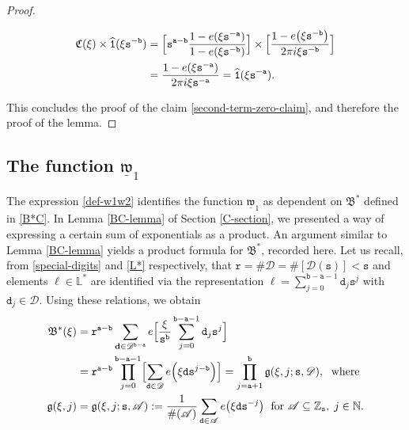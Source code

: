 \documentclass[12pt, twoside]{article}
\theoremstyle{definition}
\numberwithin{equation}{section}
\begin{document}
\begin{proof}
\begin{itemize}
\begin{align*} 
\mathfrak C(\xi) \times \widehat{\mathtt 1}(\xi \mathtt s^{-\mathtt b}) &= \Bigl[\mathtt s^{\mathtt a - \mathtt b} \frac{1 - e(\xi \mathtt s^{-\mathtt a})}{1 - e(\xi \mathtt s^{- \mathtt b})} \Bigr] \times \Bigl[\frac{1 - e \bigl(\xi \mathtt s^{-\mathtt b}\bigr)}{2 \pi i \xi \mathtt s^{-\mathtt b}} \Bigr] \\
&= \frac{1 - e(\xi \mathtt s^{-\mathtt a})}{2 \pi i \xi \mathtt s^{-\mathtt a}} = \widehat{\mathtt 1}(\xi \mathtt s^{-\mathtt a}).
\end{align*}
\end{itemize}
This concludes the proof of the claim \eqref{second-term-zero-claim}, and therefore the proof of the lemma.  
\end{proof}
\subsection{The function $\underline{\mathfrak w}_1$} \label{w1-section}
The expression \eqref{def-w1w2} identifies the function $\underline{\mathfrak w}_1$ as dependent on $\mathfrak B^{\ast}$ defined in \eqref{B*C}. In Lemma \ref{BC-lemma} of Section \ref{C-section}, we presented a way of expressing a certain sum of exponentials as a product. An argument similar to Lemma \ref{BC-lemma} yields a product formula for $\mathfrak B^{\ast}$, recorded here. Let us recall, from \eqref{special-digits} and \eqref{L*} respectively, that $\mathtt r = \# \mathscr{D} = \# [\mathscr{D}(\mathtt s)]< \mathtt s$ and elements $\ell \in \mathbb{L}^\ast$ are identified via the representation $\ell = \sum_{j = 0}^{\mathtt b-\mathtt a - 1} \mathtt d_j \mathtt s^j$ with $\mathtt d_j \in \mathscr{D}$. Using these relations, we obtain 
\begin{align} 
\mathfrak B^{\ast}(\xi) &= \mathtt r^{\mathtt a - \mathtt b} \sum_{\mathbf d \in \mathscr{D}^{\mathtt b -\mathtt a}} e \Bigl[ \frac{\xi}{\mathtt s^{\mathtt b}} \sum_{j=0}^{\mathtt b- \mathtt a -1} \mathtt d_j \mathtt s^j \Bigr] \nonumber \\ &= \mathtt r^{\mathtt a - \mathtt b}\prod_{j=0}^{\mathtt b -\mathtt a -1} \Bigl[ \sum_{\mathtt d \in \mathscr{D}} e\Bigl(\xi \mathtt d \mathtt s^{j - \mathtt b} \Bigr) \Bigr]  = \prod_{j= \mathtt a +1}^{\mathtt b} \mathfrak g(\xi, j; \mathtt s, \mathscr{D}), \; \text{ where } \label{B*-rep} \\  \mathfrak g(\xi, j) &= \mathfrak g(\xi, j ; \mathtt s,  \mathscr{A} ) := \frac{1}{\#( \mathscr{A} )}\sum_{\mathtt d \in  \mathscr{A} } e\bigl(\xi \mathtt d \mathtt s^{-j} \bigr) \; \text{ for }  \mathscr{A}  \subseteq  \mathbb Z_{\mathtt s}, \; j \in \mathbb N. \label{exp-sum-g-def} 
\end{align}
\end{document}
